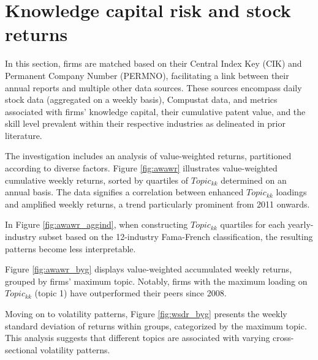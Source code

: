 \documentclass[12pt, letterpaper]{article}
\begin{document}
\section{Knowledge capital risk and stock returns}


In this section, firms are matched based on their Central Index Key (CIK) and Permanent Company Number (PERMNO), facilitating a link between their annual reports and multiple other data sources. These sources encompass daily stock data (aggregated on a weekly basis), Compustat data, and metrics associated with firms' knowledge capital, their cumulative patent value, and the skill level prevalent within their respective industries as delineated in prior literature.

The investigation includes an analysis of value-weighted returns, partitioned according to diverse factors. Figure \ref{fig:awawr} illustrates value-weighted cumulative weekly returns, sorted by quartiles of $Topic_{kk}$ determined on an annual basis. The data signifies a correlation between enhanced $Topic_{kk}$ loadings and amplified weekly returns, a trend particularly prominent from 2011 onwards.


In Figure \ref{fig:awawr_aggind}, when constructing $Topic_{kk}$ quartiles for each yearly-industry subset based on the 12-industry Fama-French classification, the resulting patterns become less interpretable.


Figure \ref{fig:awawr_byg} displays value-weighted accumulated weekly returns, grouped by firms' maximum topic. Notably, firms with the maximum loading on $Topic_{kk}$ (topic 1) have outperformed their peers since 2008.


Moving on to volatility patterns, Figure \ref{fig:wsdr_byg} presents the weekly standard deviation of returns within groups, categorized by the maximum topic. This analysis suggests that different topics are associated with varying cross-sectional volatility patterns.
\end{document}
